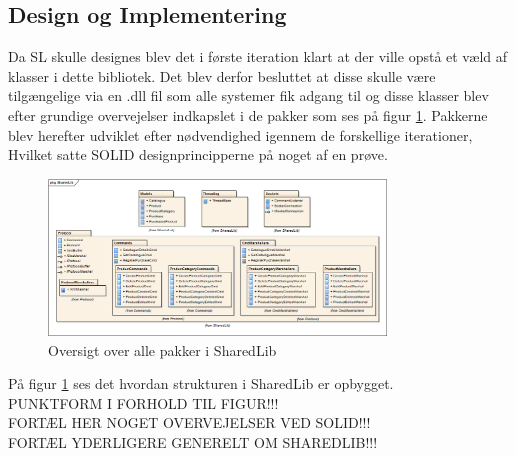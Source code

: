 \subsection{Design og Implementering}

Da \gls{SL} skulle designes blev det i første iteration klart at der ville opstå et væld af klasser i dette bibliotek. Det blev derfor besluttet at disse skulle være tilgængelige via en .dll fil som alle systemer fik adgang til og disse klasser blev efter grundige overvejelser indkapslet i de pakker som ses på figur \ref{fig:oversigtSL}. Pakkerne blev herefter udviklet efter nødvendighed igennem de forskellige iterationer, Hvilket satte SOLID designprincipperne på noget af en prøve.

\begin{figure}[!h]
    \centering
    \includegraphics[width=0.8\textwidth]{Systemdesign/SharedLib/Images/SharedLib_Package.png}
    \caption{Oversigt over alle pakker i SharedLib}
    \label{fig:oversigtSL}
\end{figure}

På figur \ref{fig:oversigtSL} ses det hvordan strukturen i SharedLib er opbygget.  \\

PUNKTFORM I FORHOLD TIL FIGUR!!!\\

FORTÆL HER NOGET OVERVEJELSER VED SOLID!!!\\

FORTÆL YDERLIGERE GENERELT OM SHAREDLIB!!!\\




